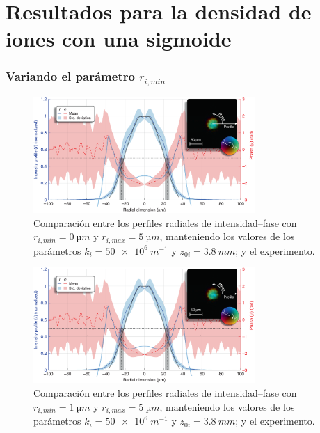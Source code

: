 \chapter{Resultados para la densidad de iones con una sigmoide}\label{anx:1}
\subsection*{Variando el parámetro $r_{i,min}$}

\begin{figure}[htbp]
  \centering
  \includegraphics[width=0.75\textwidth]{Figuras/anx_cmp_11.png}
  \caption*{Comparación entre los perfiles radiales de intensidad--fase con $r_{i,min}=\qty{0}{µm}$ y $r_{i,max}=\qty{5}{µm}$, manteniendo los valores de los parámetros $k_{i}=\qty{50e6}{m^{-1}}$ y $z_{0i}=\qty{3.8}{mm}$; y el experimento.}
\end{figure}

\begin{figure}[htbp]
  \centering
  \includegraphics[width=0.75\textwidth]{Figuras/anx_cmp_12.png}
  \caption*{Comparación entre los perfiles radiales de intensidad--fase con $r_{i,min}=\qty{1}{µm}$ y $r_{i,max}=\qty{5}{µm}$, manteniendo los valores de los parámetros $k_{i}=\qty{50e6}{m^{-1}}$ y $z_{0i}=\qty{3.8}{mm}$; y el experimento.}
\end{figure}

\newpage

